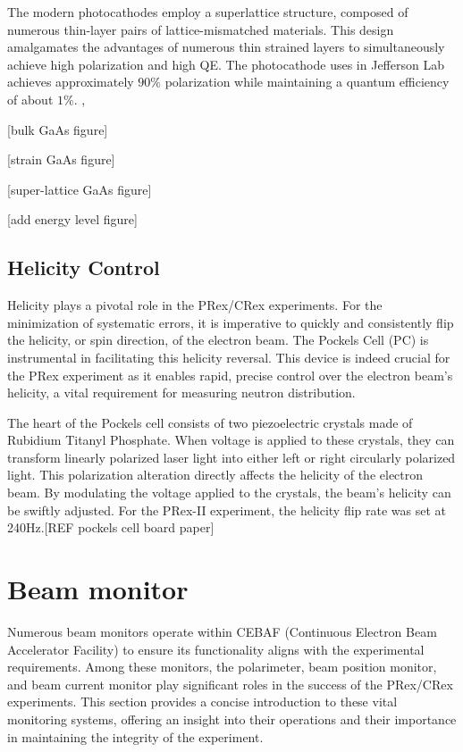 The modern photocathodes employ a superlattice structure, composed of numerous thin-layer pairs of lattice-mismatched materials. This design amalgamates the advantages of numerous thin strained layers to simultaneously achieve high polarization and high QE. The photocathode uses in Jefferson Lab achieves approximately $90\%$ polarization while maintaining a quantum efficiency of about $1\%$. \cite{PhysRevB.13.5484}, \cite{ADDERLEY2023167710}


[bulk GaAs figure]

[strain GaAs figure]

[super-lattice GaAs figure]

[add energy level figure]

\subsection{Helicity Control}
Helicity plays a pivotal role in the PRex/CRex experiments. For the minimization of systematic errors, it is imperative to quickly and consistently flip the helicity, or spin direction, of the electron beam. The Pockels Cell (PC) is instrumental in facilitating this helicity reversal. This device is indeed crucial for the PRex experiment as it enables rapid, precise control over the electron beam's helicity, a vital requirement for measuring neutron distribution.

The heart of the Pockels cell consists of two piezoelectric crystals made of Rubidium Titanyl Phosphate. When voltage is applied to these crystals, they can transform linearly polarized laser light into either left or right circularly polarized light. This polarization alteration directly affects the helicity of the electron beam. By modulating the voltage applied to the crystals, the beam's helicity can be swiftly adjusted. For the PRex-II experiment, the helicity flip rate was set at 240Hz.[REF pockels cell board paper] 

\section{Beam monitor}

Numerous beam monitors operate within CEBAF (Continuous Electron Beam Accelerator Facility) to ensure its functionality aligns with the experimental requirements. Among these monitors, the polarimeter, beam position monitor, and beam current monitor play significant roles in the success of the PRex/CRex experiments. This section provides a concise introduction to these vital monitoring systems, offering an insight into their operations and their importance in maintaining the integrity of the experiment.

